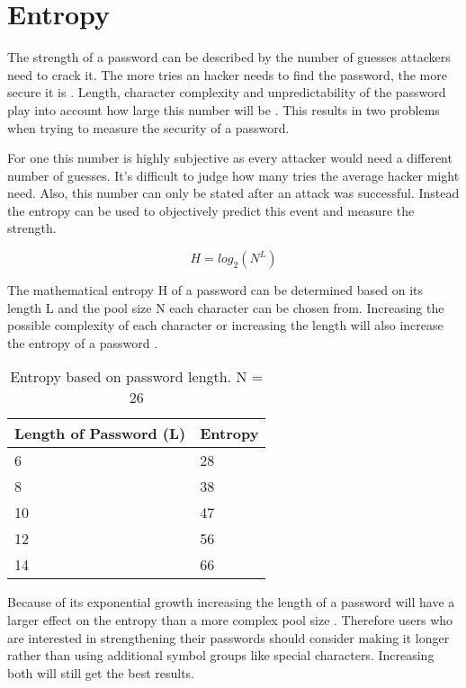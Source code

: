 \section{Entropy}

The strength of a password can be described by the number of guesses attackers need to crack it. The more tries an hacker needs to find the password, the more secure it is \cite{passwordquality}. Length, character complexity and unpredictability of the password play into account how large this number will be \cite{passwordstrength}. This results in two problems when trying to measure the security of a password.

For one this number is highly subjective as every attacker would need a different number of guesses. It's difficult to judge how many tries the average hacker might need. Also, this number can only be stated after an attack was successful. Instead the entropy can be used to objectively predict this event and measure the strength.

\begin{equation}
H = log_2(N^L)
\end{equation}

The mathematical entropy H of a password can be determined based on its length L and the pool size N each character can be chosen from. Increasing the possible complexity of each character or increasing the length will also increase the entropy of a password \cite{webernetz}.

\begin{table}[h!]
\centering
\begin{tabular}{l l}
    Length of Password (L)  & Entropy \\
    \hline
    6                       & 28 \\
    8                       & 38 \\
	10                      & 47 \\
    12                      & 56 \\
    14						& 66
\end{tabular}
\caption{Entropy based on password length. N = 26}
\end{table}

Because of its exponential growth increasing the length of a password will have a larger effect on the entropy than a more complex pool size \cite{webernetz}. Therefore users who are interested in strengthening their passwords should consider making it longer rather than using additional symbol groups like special characters. Increasing both will still get the best results.

